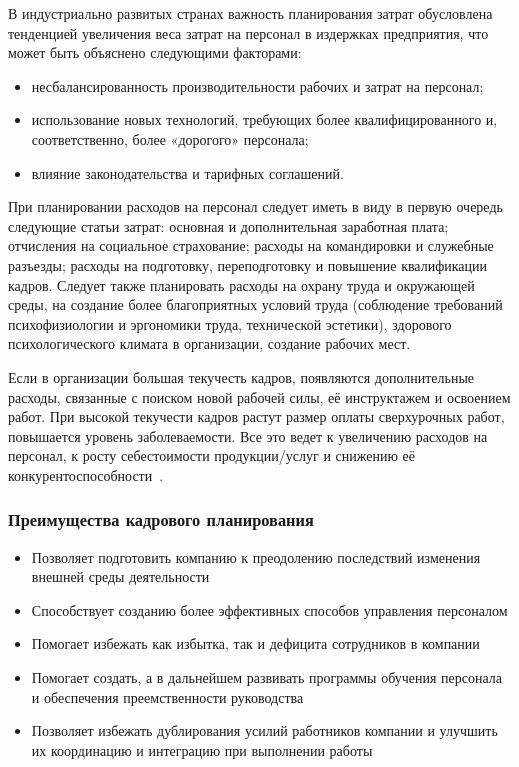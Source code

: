 \documentclass{../industrial-development}
\begin{document}
В индустриально развитых странах важность планирования затрат обусловлена тенденцией увеличения веса затрат на персонал в издержках предприятия, что может быть объяснено следующими факторами:
\begin{itemize}
\item несбалансированность производительности рабочих и затрат на персонал;
\item использование новых технологий, требующих более квалифицированного и, соответственно, более «дорогого» персонала;
\item влияние законодательства и тарифных соглашений.
\end{itemize}

При планировании расходов на персонал следует иметь в виду в первую очередь следующие статьи затрат: основная и дополнительная заработная плата; отчисления на социальное страхование; расходы на командировки и служебные разъезды; расходы на подготовку, переподготовку и повышение квалификации кадров. Следует также планировать расходы на охрану труда и окружающей среды, на создание более благоприятных условий труда (соблюдение требований психофизиологии и эргономики труда, технической эстетики), здорового психологического климата в организации, создание рабочих мест.

Если в организации большая текучесть кадров, появляются дополнительные расходы, связанные с поиском новой рабочей силы, её инструктажем и освоением работ. При высокой текучести кадров растут размер оплаты сверхурочных работ, повышается уровень заболеваемости. Все это ведет к увеличению расходов на персонал, к росту себестоимости продукции/услуг и снижению её конкурентоспособности~\cite{Durakova}.


\begin{frame} \frametitle{Преимущества кадрового планирования}

  \begin{itemize}
	\item Позволяет подготовить компанию к преодолению последствий изменения внешней среды деятельности
	\item	Способствует созданию более эффективных способов управления персоналом
	\item	Помогает избежать как избытка, так и дефицита сотрудников в компании
	\item	Помогает создать, а в дальнейшем развивать программы обучения персонала и обеспечения преемственности руководства
	\item	Позволяет избежать дублирования усилий работников компании и улучшить их координацию и интеграцию при выполнении работы 

	  \end{itemize}

\end{frame}
\end{document}
